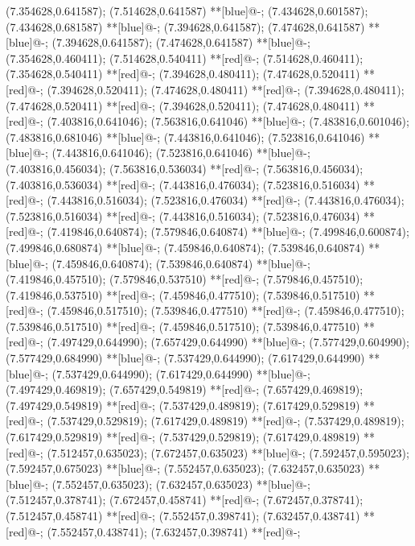 (7.354628,0.641587); (7.514628,0.641587) **[blue]@{-};
(7.434628,0.601587); (7.434628,0.681587) **[blue]@{-};
(7.394628,0.641587); (7.474628,0.641587) **[blue]@{-};
(7.394628,0.641587); (7.474628,0.641587) **[blue]@{-};
(7.354628,0.460411); (7.514628,0.540411) **[red]@{-};
(7.514628,0.460411); (7.354628,0.540411) **[red]@{-};
(7.394628,0.480411); (7.474628,0.520411) **[red]@{-};
(7.394628,0.520411); (7.474628,0.480411) **[red]@{-};
(7.394628,0.480411); (7.474628,0.520411) **[red]@{-};
(7.394628,0.520411); (7.474628,0.480411) **[red]@{-};
(7.403816,0.641046); (7.563816,0.641046) **[blue]@{-};
(7.483816,0.601046); (7.483816,0.681046) **[blue]@{-};
(7.443816,0.641046); (7.523816,0.641046) **[blue]@{-};
(7.443816,0.641046); (7.523816,0.641046) **[blue]@{-};
(7.403816,0.456034); (7.563816,0.536034) **[red]@{-};
(7.563816,0.456034); (7.403816,0.536034) **[red]@{-};
(7.443816,0.476034); (7.523816,0.516034) **[red]@{-};
(7.443816,0.516034); (7.523816,0.476034) **[red]@{-};
(7.443816,0.476034); (7.523816,0.516034) **[red]@{-};
(7.443816,0.516034); (7.523816,0.476034) **[red]@{-};
(7.419846,0.640874); (7.579846,0.640874) **[blue]@{-};
(7.499846,0.600874); (7.499846,0.680874) **[blue]@{-};
(7.459846,0.640874); (7.539846,0.640874) **[blue]@{-};
(7.459846,0.640874); (7.539846,0.640874) **[blue]@{-};
(7.419846,0.457510); (7.579846,0.537510) **[red]@{-};
(7.579846,0.457510); (7.419846,0.537510) **[red]@{-};
(7.459846,0.477510); (7.539846,0.517510) **[red]@{-};
(7.459846,0.517510); (7.539846,0.477510) **[red]@{-};
(7.459846,0.477510); (7.539846,0.517510) **[red]@{-};
(7.459846,0.517510); (7.539846,0.477510) **[red]@{-};
(7.497429,0.644990); (7.657429,0.644990) **[blue]@{-};
(7.577429,0.604990); (7.577429,0.684990) **[blue]@{-};
(7.537429,0.644990); (7.617429,0.644990) **[blue]@{-};
(7.537429,0.644990); (7.617429,0.644990) **[blue]@{-};
(7.497429,0.469819); (7.657429,0.549819) **[red]@{-};
(7.657429,0.469819); (7.497429,0.549819) **[red]@{-};
(7.537429,0.489819); (7.617429,0.529819) **[red]@{-};
(7.537429,0.529819); (7.617429,0.489819) **[red]@{-};
(7.537429,0.489819); (7.617429,0.529819) **[red]@{-};
(7.537429,0.529819); (7.617429,0.489819) **[red]@{-};
(7.512457,0.635023); (7.672457,0.635023) **[blue]@{-};
(7.592457,0.595023); (7.592457,0.675023) **[blue]@{-};
(7.552457,0.635023); (7.632457,0.635023) **[blue]@{-};
(7.552457,0.635023); (7.632457,0.635023) **[blue]@{-};
(7.512457,0.378741); (7.672457,0.458741) **[red]@{-};
(7.672457,0.378741); (7.512457,0.458741) **[red]@{-};
(7.552457,0.398741); (7.632457,0.438741) **[red]@{-};
(7.552457,0.438741); (7.632457,0.398741) **[red]@{-};
